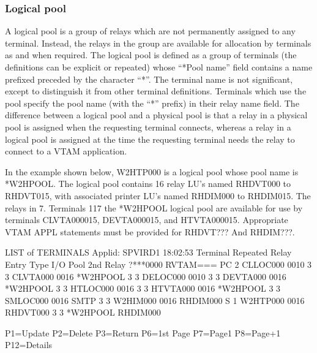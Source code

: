 \documentclass[letterpaper,10pt,english]{sphinxmanual}
\begin{document}
\sphinxAtStartPar
{}


\subsubsection{Logical pool}
\label{\detokenize{connectivity_guide:logical-pool}}\label{\detokenize{connectivity_guide:v462cn-logicalpool}}
\sphinxAtStartPar
A logical pool is a group of relays which are not permanently assigned to any terminal. Instead, the relays in the group are available for allocation by terminals as and when required. The logical pool is defined as a group of terminals (the definitions can be explicit or repeated) whose “*Pool name” field contains a name prefixed preceded by the character “*”. The terminal name is not significant, except to distinguish it from other terminal definitions. Terminals which use the pool specify the pool name (with the “*” prefix) in their relay name field. The difference between a logical pool and a physical pool is that a relay in a physical pool is assigned when the requesting terminal connects, whereas a relay in a logical pool is assigned at the time the requesting terminal needs the relay to connect to a VTAM application.

\sphinxAtStartPar
In the example shown below, W2HTP000 is a logical pool whose pool name is *W2HPOOL. The logical pool contains 16 relay LU’s named RHDVT000 to RHDVT015, with associated printer LU’s named RHDIM000 to RHDIM015. The relays in 7. Terminals 117 the *W2HPOOL logical pool are available for use by terminals CLVTA000\sphinxhyphen{}015, DEVTA000\sphinxhyphen{}015, and HTVTA000\sphinxhyphen{}015. Appropriate VTAM APPL statements must be provided for RHDVT??? And RHDIM???.

\begin{sphinxVerbatim}[commandchars=\\\{\}]
LIST of TERMINALS \PYGZhy{}\PYGZhy{}\PYGZhy{}\PYGZhy{}\PYGZhy{}\PYGZhy{}\PYGZhy{}\PYGZhy{}\PYGZhy{}\PYGZhy{}\PYGZhy{}\PYGZhy{}\PYGZhy{}\PYGZhy{}\PYGZhy{}\PYGZhy{}\PYGZhy{}\PYGZhy{}\PYGZhy{}\PYGZhy{}\PYGZhy{}\PYGZhy{}\PYGZhy{}\PYGZhy{}\PYGZhy{}\PYGZhy{}\PYGZhy{}\PYGZhy{}\PYGZhy{}\PYGZhy{}\PYGZhy{}\PYGZhy{}\PYGZhy{}\PYGZhy{} Applid: SPVIRD1 18:02:53
Terminal Repeated    Relay       Entry    Type I/O  Pool      2nd Relay
?***0000             RVTAM===    PC       2
CLLOC000 0010                             3    3
CLVTA000 0016        *W2HPOOL             3    3
DELOC000 0010                             3    3
DEVTA000 0016        *W2HPOOL             3    3
HTLOC000 0016                             3    3
HTVTA000 0016        *W2HPOOL             3    3
SMLOC000 0016                    SMTP     3    3
W2HIM000 0016        RHDIM000             S    1
W2HTP000 0016        RHDVT000             3    3    *W2HPOOL   RHDIM000



P1=Update            P2=Delete            P3=Return             P6=1st Page
P7=Page\PYGZhy{}1            P8=Page+1            P12=Details
\end{sphinxVerbatim}
\end{document}
